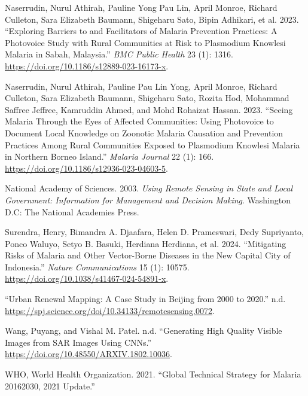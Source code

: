 \documentclass[
  letterpaper,
  DIV=11,
  numbers=noendperiod]{scrreprt}
\newlength{\cslhangindent}
\newlength{\cslentryspacingunit} %
\newenvironment{CSLReferences}[2] %
 {%
  \setlength{\parindent}{0pt}
  \ifodd #1
  \let\oldpar\par
  \def\par{\hangindent=\cslhangindent\oldpar}
  \fi
  \setlength{\parskip}{#2\cslentryspacingunit}
 }%
 {}
\begin{document}
\begin{CSLReferences}{1}{0}
\leavevmode{}%
Naserrudin, Nurul Athirah, Pauline Yong Pau Lin, April Monroe, Richard
Culleton, Sara Elizabeth Baumann, Shigeharu Sato, Bipin Adhikari, et al.
2023. {``Exploring Barriers to and Facilitators of Malaria Prevention
Practices: A Photovoice Study with Rural Communities at Risk to
Plasmodium Knowlesi Malaria in Sabah, Malaysia.''} \emph{BMC Public
Health} 23 (1): 1316. \url{https://doi.org/10.1186/s12889-023-16173-x}.

\leavevmode{}%
Naserrudin, Nurul Athirah, Pauline Pau Lin Yong, April Monroe, Richard
Culleton, Sara Elizabeth Baumann, Shigeharu Sato, Rozita Hod, Mohammad
Saffree Jeffree, Kamruddin Ahmed, and Mohd Rohaizat Hassan. 2023.
{``Seeing Malaria Through the Eyes of Affected Communities: Using
Photovoice to Document Local Knowledge on Zoonotic Malaria Causation and
Prevention Practices Among Rural Communities Exposed to Plasmodium
Knowlesi Malaria in Northern Borneo Island.''} \emph{Malaria Journal} 22
(1): 166. \url{https://doi.org/10.1186/s12936-023-04603-5}.

\leavevmode{}%
National Academy of Sciences. 2003. \emph{Using Remote Sensing in State
and Local Government: Information for Management and Decision Making}.
Washington D.C: The National Academies Press.

\leavevmode{}%
Surendra, Henry, Bimandra A. Djaafara, Helen D. Prameswari, Dedy
Supriyanto, Ponco Waluyo, Setyo B. Basuki, Herdiana Herdiana, et al.
2024. {``Mitigating Risks of Malaria and Other Vector-Borne Diseases in
the New Capital City of Indonesia.''} \emph{Nature Communications} 15
(1): 10575. \url{https://doi.org/10.1038/s41467-024-54891-x}.

\leavevmode{}%
{``Urban Renewal Mapping: A Case Study in Beijing from 2000 to 2020.''}
n.d. \url{https://spj.science.org/doi/10.34133/remotesensing.0072}.

\leavevmode{}%
Wang, Puyang, and Vishal M. Patel. n.d. {``Generating High Quality
Visible Images from SAR Images Using CNNs.''}
\url{https://doi.org/10.48550/ARXIV.1802.10036}.

\leavevmode{}%
WHO, World Health Organization. 2021. {``Global Technical Strategy for
Malaria 2016{\textendash}2030, 2021 Update.''}


\end{CSLReferences}
\end{document}
